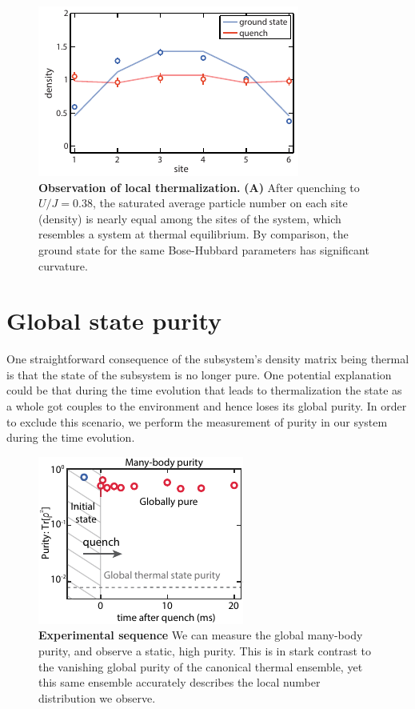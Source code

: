 \begin{figure}[t!]
	\centering
	\includegraphics[scale=1.5]{figures/ETH_density.pdf}
	\caption{{\bf Observation of local thermalization.} {\bf(A)} After quenching to $U/J=0.38$, the saturated average particle number on each site (density) is nearly equal among the sites of the system, which resembles a system at thermal equilibrium. By comparison, the ground state for the same Bose-Hubbard parameters has significant curvature.}
	\label{fig:ETH_density}
\end{figure} 

\section{Global state purity}

One straightforward consequence of the subsystem's density matrix being thermal is that the state of the subsystem is no longer pure. One potential explanation could be that during the time evolution that leads to thermalization the state as a whole got couples to the environment and hence loses its global purity. In order to exclude this scenario, we perform the measurement of purity in our system during the time evolution. 

\begin{figure}[h!]
	\centering
	\includegraphics[scale=2]{figures/ETH_purity.pdf}
	\caption{{\bf Experimental sequence}  We can measure the global many-body purity, and observe a static, high purity. This is in stark contrast to the vanishing global purity of the canonical thermal ensemble, yet this same ensemble accurately describes the local number distribution we observe.
	}
	
	\label{fig:ETH_purity}
\end{figure}  


